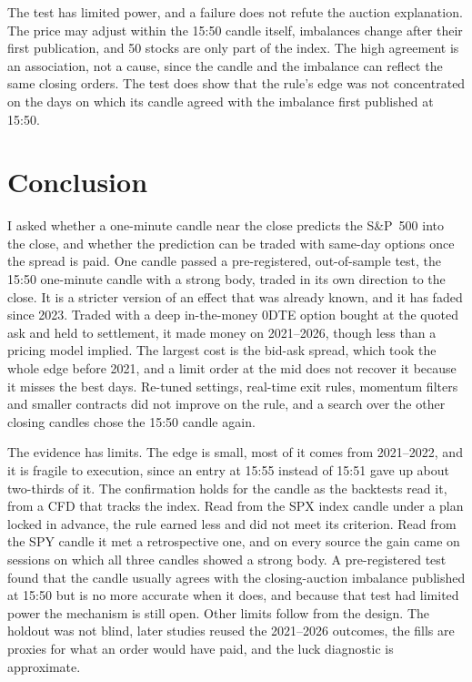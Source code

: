 \documentclass[12pt,letterpaper]{article}
\begin{document}
The test has limited power, and a failure does not refute the auction
explanation. The price may adjust within the 15:50
candle itself, imbalances change after their first publication, and 50 stocks
are only part of the index. The high agreement is an association, not a cause, since the candle and the
imbalance can reflect the same closing orders. The test does show that the rule's edge was not concentrated on the days on which
its candle agreed with the imbalance first published at 15:50.

\section{Conclusion}
\label{sec:conclusion}

I asked whether a one-minute candle near the close predicts the
S\&P~500 into the close, and whether the prediction can be traded with same-day
options once the spread is paid. One candle passed a pre-registered, out-of-sample test, the 15:50 one-minute
candle with a strong body, traded in its own direction to the close. It is a
stricter version of an effect that was already known, and it has faded since
2023. Traded with a deep in-the-money 0DTE option bought at the quoted ask and
held to settlement, it made money on 2021--2026, though less than a pricing
model implied. The largest cost is the bid-ask spread, which took the whole
edge before 2021, and a limit order at the mid does not recover it because it
misses the best days. Re-tuned settings, real-time exit rules, momentum filters
and smaller contracts did not improve on the rule, and a search over the other closing candles chose the 15:50 candle again.

The evidence has limits. The edge is small, most of it comes from 2021--2022,
and it is fragile to execution, since an entry at 15:55 instead of 15:51 gave
up about two-thirds of it. The confirmation holds for the candle as
the backtests read it, from a CFD that tracks the index. Read from the SPX index candle under a plan locked in
advance, the rule earned less and did not meet its criterion. Read from the SPY candle
it met a retrospective one, and on every source the gain came on sessions
on which all three candles showed a strong body. A pre-registered test found that
the candle usually agrees with the closing-auction imbalance published at 15:50
but is no more accurate when it does, and because that test had limited power
the mechanism is still open. Other limits follow from the design. The holdout
was not blind, later studies reused the 2021--2026 outcomes, the fills are
proxies for what an order would have paid, and the luck diagnostic is
approximate.
\end{document}
